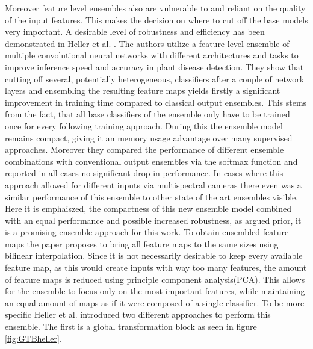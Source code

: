 Moreover feature level ensembles also are vulnerable to and reliant on the quality of the input features. This makes the decision on where 
to cut off the base models very important.
\newline
A desirable level of robustness and efficiency has been demonstrated in Heller et al. \cite{EnsembleHeller2023}. The authors utilize a feature level ensemble of multiple 
convolutional neural networks with different architectures and tasks to improve inference speed and accuracy in plant disease detection.
They show that cutting off several, potentially heterogeneous, classifiers after a couple of network layers and ensembling the 
resulting feature maps yields firstly a significant improvement in training time compared to classical output ensembles. This stems from 
the fact, that all base classifiers of the ensemble only have to be trained once for every following training approach. During this the ensemble 
model remains compact, giving it an memory usage advantage over many supervised approaches. 
Moreover they compared the performance of different ensemble combinations with conventional 
output ensembles via the softmax function and reported in all cases no significant drop in performance. In cases where this approach allowed for 
different inputs via multispectral cameras \cite{EnsembleHeller2023} there even was a similar performance of this ensemble to other state of the 
art ensembles visible. Here it is emphaiszed, the compactness of this new ensemble model combined with an equal performance and possible 
increased robustness, as argued prior, it is a promising ensemble approach for this work.\newline
To obtain ensembled feature maps the paper proposes to bring all feature maps to the same sizes using bilinear interpolation. Since 
it is not necessarily desirable to keep every available feature map, as this would create inputs with way too many features, the amount of feature 
maps is reduced using principle component analysis(PCA). This allows for the ensemble to focus only on the most important features, while maintaining 
an equal amount of maps as if it were composed of a single classifier. To be more specific Heller et al. \cite{EnsembleHeller2023} introduced two different 
approaches to perform this ensemble. The first is a global transformation block as seen in figure \ref{fig:GTBheller}. 
